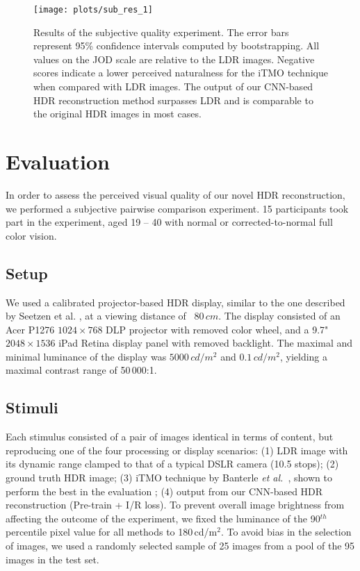 \documentclass[acmtog]{acmart}
\newcommand{\etal}{\emph{et al.\ }}
\newcommand\belowfigspace{-2pt}
\newcommand\customsection[1]{\subsection{#1}}
\begin{document}
\begin{figure*}[]
	\centering
	\texttt{[image: plots/sub\_res\_1]}
	\vspace{-15pt}
	\caption{\label{fig:eval_pwc} Results of the subjective quality experiment. The error bars represent 95\% confidence intervals computed by bootstrapping. All values on the JOD scale are relative to the LDR images. Negative scores indicate a lower perceived naturalness for the iTMO technique when compared with LDR images. The output of our CNN-based HDR reconstruction method surpasses LDR and is comparable to the original HDR images in most cases.}
	\vspace{\belowfigspace}
\end{figure*}

\section{Evaluation}\label{sec:evaluation}
In order to assess the perceived visual quality of our novel HDR reconstruction, we performed a subjective pairwise comparison experiment. 15 participants took part in the experiment, aged 19 -- 40 with normal or corrected-to-normal full color vision. 

\customsection{Setup}
We used a calibrated projector-based HDR display, similar to the one described by Seetzen et al. \citeyear{Seetzen:2004:HDR:1015706.1015797}, at a viewing distance of ~$80\,cm$. The display consisted of an Acer P1276 $1024\times768$ DLP projector with removed color wheel, and a 9.7" $2048\times1536$ iPad Retina display panel with removed backlight. The maximal and minimal luminance of the display was $5000\,cd/m^2$ and $0.1\,cd/m^2$, yielding a maximal contrast range of 50\,000:1. 

\customsection{Stimuli}
Each stimulus consisted of a pair of images identical in terms of content, but reproducing one of the four processing or display scenarios: (1) LDR image with its dynamic range clamped to that of a typical DSLR camera (10.5 stops); (2) ground truth HDR image; (3) iTMO technique by Banterle \etal \citeyear{Banterle2008}, shown to perform the best in the evaluation \cite{Banterle2009}; (4) output from our CNN-based HDR reconstruction (Pre-train + I/R loss). To prevent overall image brightness from affecting the outcome of the experiment, we fixed the luminance of the 90$^{th}$ percentile pixel value for all methods to 180\,cd/m$^2$. To avoid bias in the selection of images, we used a randomly selected sample of 25 images from a pool of the 95 images in the test set.
\end{document}
